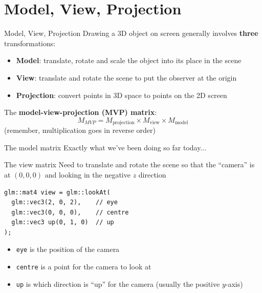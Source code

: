 \part{Model, View, Projection}
\frame{\partpage}

\begin{frame}{Model, View, Projection}
	\pause Drawing a 3D object on screen generally involves \textbf{three} transformations:
	\begin{itemize}
		\pause\item \textbf{Model}: translate, rotate and scale the object into its place in the scene
		\pause\item \textbf{View}: translate and rotate the scene to put the observer at the origin
		\pause\item \textbf{Projection}: convert points in 3D space to points on the 2D screen
	\end{itemize}
	\pause The \textbf{model-view-projection (MVP) matrix}:
		$$ M_{MVP} = M_{\text{projection}} \times M_{\text{view}} \times M_{\text{model}} $$
	(remember, multiplication goes in reverse order)
\end{frame}

\begin{frame}{The model matrix}
	\pause Exactly what we've been doing so far today...
\end{frame}

\begin{frame}[fragile]{The view matrix}
	\pause Need to translate and rotate the scene so that the ``camera'' is at $(0,0,0)$ and looking in the negative $z$ direction
	\pause\begin{lstlisting}
glm::mat4 view = glm::lookAt(
  glm::vec3(2, 0, 2),    // eye
  glm::vec3(0, 0, 0),    // centre
  glm::vec3 up(0, 1, 0)  // up
);
	\end{lstlisting}
	\begin{itemize}
		\pause\item \lstinline{eye} is the position of the camera
		\pause\item \lstinline{centre} is a point for the camera to look at
		\pause\item \lstinline{up} is which direction is ``up'' for the camera (usually the positive $y$-axis)
	\end{itemize}
\end{frame}

